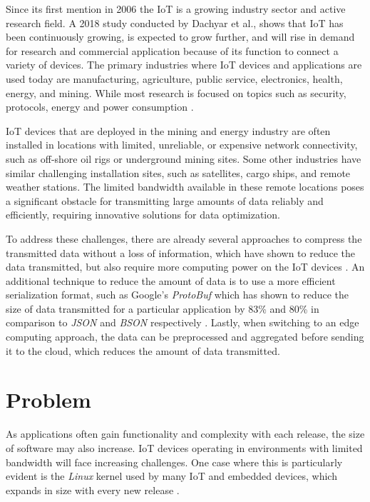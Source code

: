 Since its first mention in 2006 \cite{Adelmann2006ToolkitFB} the \ac{IoT}
is a growing industry sector and active research field. A 2018 study conducted
by Dachyar et al., shows that \ac{IoT} has been continuously growing, is expected
to grow further, and will rise in demand for research and commercial application
because of its function to connect a variety of devices. The primary industries
where \ac{IoT} devices and applications are used today are manufacturing,
agriculture, public service, electronics, health, energy, and mining.
While most research is focused on topics such as security, protocols, energy and
power consumption \cite{dachyar2019knowledge}.

\ac{IoT} devices that are deployed in the mining and energy industry are often
installed in locations with limited, unreliable, or expensive network
connectivity, such as off-shore oil rigs or underground mining sites.
Some other industries have similar challenging installation sites, such as
satellites, cargo ships, and remote weather stations.
The limited bandwidth available in these remote locations poses a significant
obstacle for transmitting large amounts of data reliably and efficiently,
requiring innovative solutions for data optimization.

To address these challenges, there are already several approaches to compress
the transmitted data without a loss of information, which have shown to reduce
the data transmitted, but also require more computing power on the \ac{IoT}
devices \cite{9243457}. An additional technique to reduce the amount of data
is to use a more efficient serialization format, such as Google's \textit{ProtoBuf}
which has shown to reduce the size of data transmitted for a particular application
by 83\% and 80\% in comparison to \textit{JSON} and \textit{BSON} respectively \cite{7765670}.
Lastly, when switching to an edge computing approach, the data can be preprocessed
and aggregated before sending it to the cloud, which reduces the amount of data
transmitted.


\section{Problem}
As applications often gain functionality and complexity with each release, the
size of software may also increase. \ac{IoT} devices operating in environments
with limited bandwidth will face increasing challenges. One case where this is
particularly evident is the \textit{Linux} kernel used by many \ac{IoT} and embedded
devices, which expands in size with every new release \cite{linux-kernel-report}.

